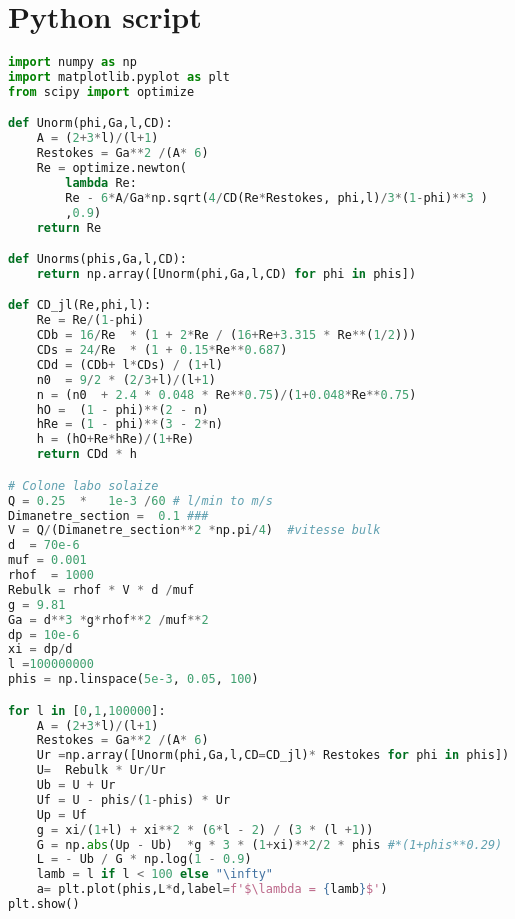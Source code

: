 \section{Python script}
\label{ap:python}
\begin{lstlisting}[language=Python,backgroundcolor=\color{gray!10}]
import numpy as np
import matplotlib.pyplot as plt
from scipy import optimize

def Unorm(phi,Ga,l,CD):
    A = (2+3*l)/(l+1)
    Restokes = Ga**2 /(A* 6) 
    Re = optimize.newton(
        lambda Re:  
        Re - 6*A/Ga*np.sqrt(4/CD(Re*Restokes, phi,l)/3*(1-phi)**3 )  
        ,0.9)
    return Re

def Unorms(phis,Ga,l,CD):
    return np.array([Unorm(phi,Ga,l,CD) for phi in phis])

def CD_jl(Re,phi,l):
    Re = Re/(1-phi) 
    CDb = 16/Re  * (1 + 2*Re / (16+Re+3.315 * Re**(1/2))) 
    CDs = 24/Re  * (1 + 0.15*Re**0.687) 
    CDd = (CDb+ l*CDs) / (1+l)
    n0  = 9/2 * (2/3+l)/(l+1) 
    n = (n0  + 2.4 * 0.048 * Re**0.75)/(1+0.048*Re**0.75) 
    hO =  (1 - phi)**(2 - n)    
    hRe = (1 - phi)**(3 - 2*n)
    h = (hO+Re*hRe)/(1+Re)
    return CDd * h  

# Colone labo solaize 
Q = 0.25  *   1e-3 /60 # l/min to m/s
Dimanetre_section =  0.1 ###
V = Q/(Dimanetre_section**2 *np.pi/4)  #vitesse bulk 
d  = 70e-6
muf = 0.001
rhof  = 1000
Rebulk = rhof * V * d /muf
g = 9.81
Ga = d**3 *g*rhof**2 /muf**2
dp = 10e-6
xi = dp/d
l =100000000
phis = np.linspace(5e-3, 0.05, 100)

for l in [0,1,100000]:
    A = (2+3*l)/(l+1)
    Restokes = Ga**2 /(A* 6) 
    Ur =np.array([Unorm(phi,Ga,l,CD=CD_jl)* Restokes for phi in phis])
    U=  Rebulk * Ur/Ur
    Ub = U + Ur
    Uf = U - phis/(1-phis) * Ur
    Up = Uf
    g = xi/(1+l) + xi**2 * (6*l - 2) / (3 * (l +1))
    G = np.abs(Up - Ub)  *g * 3 * (1+xi)**2/2 * phis #*(1+phis**0.29)
    L = - Ub / G * np.log(1 - 0.9) 
    lamb = l if l < 100 else "\infty"
    a= plt.plot(phis,L*d,label=f'$\lambda = {lamb}$') 
plt.show()


\end{lstlisting}
